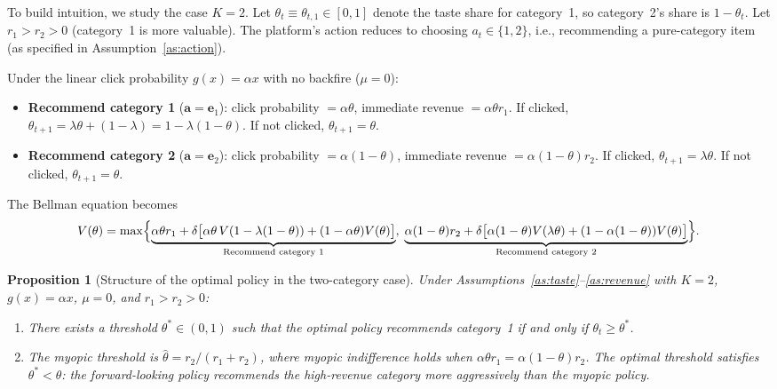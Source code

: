 \documentclass[11pt]{article}
\newtheorem{proposition}{Proposition}
\begin{document}
To build intuition, we study the case $K = 2$. Let $\theta_t \equiv \theta_{t,1} \in [0,1]$ denote the taste share for category~1, so category~2's share is $1 - \theta_t$. Let $r_1 > r_2 > 0$ (category~1 is more valuable). The platform's action reduces to choosing $a_t \in \{1, 2\}$, i.e., recommending a pure-category item (as specified in Assumption~\ref{as:action}).

Under the linear click probability $g(x) = \alpha x$ with no backfire ($\mu = 0$):

\begin{itemize}[leftmargin=1.5em]
\item \textbf{Recommend category 1} ($\mathbf{a} = \mathbf{e}_1$): click probability $= \alpha \theta$, immediate revenue $= \alpha \theta r_1$. If clicked, $\theta_{t+1} = \lambda \theta + (1-\lambda) = 1 - \lambda(1-\theta)$. If not clicked, $\theta_{t+1} = \theta$.

\item \textbf{Recommend category 2} ($\mathbf{a} = \mathbf{e}_2$): click probability $= \alpha(1-\theta)$, immediate revenue $= \alpha(1-\theta) r_2$. If clicked, $\theta_{t+1} = \lambda \theta$. If not clicked, $\theta_{t+1} = \theta$.
\end{itemize}

The Bellman equation becomes
\begin{equation}\label{eq:bellman2}
V(\theta) = \max \Bigl\{
\underbrace{\alpha \theta r_1 + \delta\bigl[\alpha\theta \, V(1-\lambda(1-\theta)) + (1-\alpha\theta) V(\theta)\bigr]}_{\text{Recommend category 1}}, \;
\underbrace{\alpha(1-\theta) r_2 + \delta\bigl[\alpha(1-\theta) V(\lambda\theta) + (1-\alpha(1-\theta)) V(\theta)\bigr]}_{\text{Recommend category 2}}
\Bigr\}.
\end{equation}

\begin{proposition}[Structure of the optimal policy in the two-category case]\label{prop:two_cat}
Under Assumptions~\ref{as:taste}--\ref{as:revenue} with $K=2$, $g(x) = \alpha x$, $\mu = 0$, and $r_1 > r_2 > 0$:
\begin{enumerate}[label=(\alph*)]
\item There exists a threshold $\theta^* \in (0,1)$ such that the optimal policy recommends category~1 if and only if $\theta_t \ge \theta^*$.
\item The myopic threshold is $\hat{\theta} = r_2 / (r_1 + r_2)$, where myopic indifference holds when $\alpha \theta r_1 = \alpha(1-\theta) r_2$. The optimal threshold satisfies $\theta^* < \hat{\theta}$: the forward-looking policy recommends the high-revenue category more aggressively than the myopic policy.
\end{enumerate}
\end{proposition}
\end{document}
